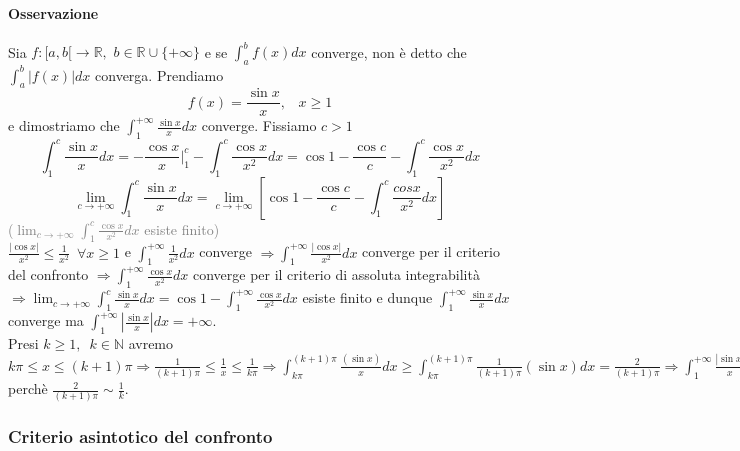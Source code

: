\documentclass{article}
\newcommand{\R}{\mathbb{R}}
\newcommand{\N}{\mathbb{N}}
\begin{document}
\paragraph{{Osservazione}}
Sia $f: [a,b[ \rightarrow \R, \,\, b\in\R\cup\{+\infty\}$ e se $\int_{a}^{b} f(x) dx$ converge, non è detto che $\int_{a}^{b}|f(x)|dx$ converga.
Prendiamo
\begin{equation*}
    f(x)= \frac{\sin x}{x}, \,\,\,\,\, x \geq 1
\end{equation*}
e dimostriamo che $ \int_{1}^{+\infty} \frac{\sin x}{x} dx$ converge. Fissiamo $c>1$
\begin{equation*}
    \int_{1}^{c} \frac{\sin x}{x} dx= -\frac{\cos x}{x} |_{1}^{c} - \int_{1}^{c} \frac{\cos x}{x^2} dx = \cos 1 - \frac{\cos c}{c} -\int_{1}^{c} \frac{\cos x}{x^2} dx
\end{equation*}
\begin{equation*}
    \lim_{c \rightarrow +\infty} \int_{1}^{c} \frac{\sin x}{x} dx =\lim_{c \rightarrow +\infty} \left[\cos 1 -\frac{\cos c}{c} - \int_{1}^{c} \frac{cosx}{x^2}dx\right] 
\end{equation*}
\textcolor{grey}{($\lim_{c \rightarrow +\infty} \int_{1}^{c} \frac{\cos x}{x^2} dx$ esiste finito)}\\
$\frac{|\cos x|}{x^2} \leq \frac{1}{x^2} \,\,\, \forall x \geq 1$ e $ \int_{1}^{+\infty} \frac{1}{x^2} dx$ converge $\Rightarrow \int_{1}^{+\infty} \frac{|\cos x|}{x^2} dx$ converge per il criterio del confronto $\Rightarrow \int_{1}^{+\infty} \frac{\cos x}{x^2}dx$ converge per il criterio di assoluta integrabilità\\
$\Rightarrow \lim_{c \rightarrow +\infty} \int_{1}^{c} \frac{\sin x}{x} dx = \cos 1 - \int_{1}^{+\infty} \frac{\cos x}{x^2} dx$ esiste finito e dunque $\int_{1}^{+\infty} \frac{\sin x}{x} dx$ converge ma $\int_{1}^{+\infty} |\frac{\sin x}{x}|dx =+\infty$.\\
Presi $k \geq 1, \,\,\, k \in \N$ avremo $k\pi \leq x \leq (k+1)\pi \Longrightarrow \frac{1}{(k+1)\pi} \leq \frac{1}{x} \leq \frac{1}{k\pi} \Longrightarrow \int_{k\pi}^{(k+1)\pi} \frac{(\sin x)}{x}dx \geq \int_{k\pi}^{(k+1)\pi} \frac{1}{(k+1)\pi} (\sin x) dx = \frac{2}{(k+1)\pi} \Longrightarrow \int_{1}^{+\infty} \frac{|\sin{x}|}{x} dx \geq \sum_{k=1}^{\infty} \int_{k\pi}^{(k+1)\pi} \frac{|\sin{x}|}{x} dx \geq \sum_{k=1}^{\infty} \frac{2}{(k+1)\pi}=+\infty$  perchè $\frac{2}{(k+1)\pi} \sim \frac{1}{k}$.

\subsubsection{{Criterio asintotico del confronto}}
\end{document}
